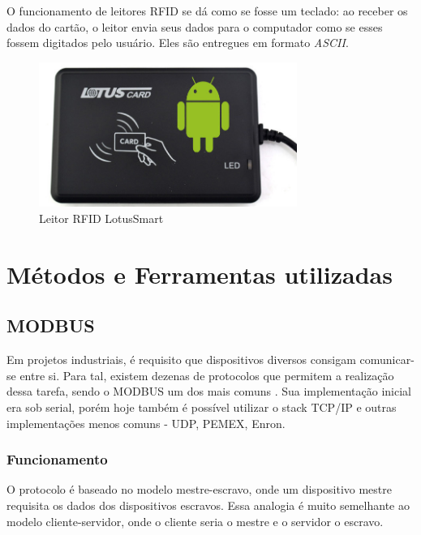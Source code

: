       O funcionamento de leitores \ac{RFID} se dá como se fosse um teclado: ao receber os dados do cartão, o leitor envia seus dados para o computador como se esses fossem digitados pelo usuário. Eles são entregues em formato \textit{ASCII}.

      \begin{figure}[H]
        \begin{center}
          \includegraphics[width=0.75\textwidth,natwidth=655,natheight=368]{assets/images/devices-rfid.jpg}
          \caption{Leitor RFID LotusSmart}
          \label{fig:ihm}
        \end{center}
      \end{figure}

  \section{Métodos e Ferramentas utilizadas}

    \subsection{MODBUS}

      Em projetos industriais, é requisito que dispositivos diversos consigam comunicar-se entre si. Para tal, existem dezenas de protocolos que permitem a realização dessa tarefa, sendo o MODBUS um dos mais comuns \cite{modbus-spec-application}. Sua implementação inicial era sob serial, porém hoje também é possível utilizar o stack TCP/IP e outras implementações menos comuns - UDP, PEMEX, Enron.

      \subsubsection{Funcionamento}

        O protocolo é baseado no modelo mestre-escravo, onde um dispositivo mestre requisita os dados dos dispositivos escravos. Essa analogia é muito semelhante ao modelo cliente-servidor, onde o cliente seria o mestre e o servidor o escravo.

